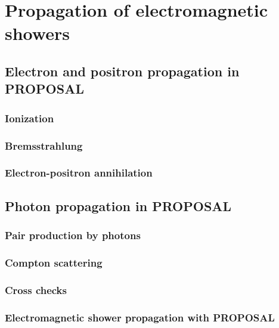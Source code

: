 \chapter{Propagation of electromagnetic showers}

\section{Electron and positron propagation in PROPOSAL}

\subsection{Ionization}

\subsection{Bremsstrahlung}

\subsection{Electron-positron annihilation}

\section{Photon propagation in PROPOSAL}

\subsection{Pair production by photons}

\subsection{Compton scattering}

\subsection{Cross checks}

\subsection{Electromagnetic shower propagation with PROPOSAL}